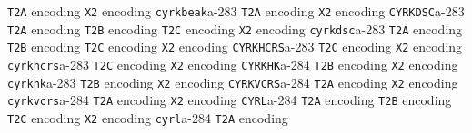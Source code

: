 \documentclass[twoside]{ltxdoc}
\makeatletter
\renewenvironment{theindex}{%
   \@restonecoltrue
   \if@twocolumn\@restonecolfalse\fi
   \columnseprule \z@
   \columnsep 35\p@
   \twocolumn[\index@prologue]%
   \IndexParms
   \let\item\@idxitem
   \ignorespaces
}{\if@restonecol\onecolumn\else\clearpage\fi}
\makeatother
\begin{document}
\begin{theindex}
    \subitem \texttt  {T2A} encoding\pfill {}
    \subitem \texttt  {X2} encoding\pfill {}
  \item \texttt  {cyrkbeak}\pfill a-283
    \subitem \texttt  {T2A} encoding\pfill {}
    \subitem \texttt  {X2} encoding\pfill {}
  \item \texttt  {CYRKDSC}\pfill a-283
    \subitem \texttt  {T2A} encoding\pfill {}
    \subitem \texttt  {T2B} encoding\pfill {}
    \subitem \texttt  {T2C} encoding\pfill {}
    \subitem \texttt  {X2} encoding\pfill {}
  \item \texttt  {cyrkdsc}\pfill a-283
    \subitem \texttt  {T2A} encoding\pfill {}
    \subitem \texttt  {T2B} encoding\pfill {}
    \subitem \texttt  {T2C} encoding\pfill {}
    \subitem \texttt  {X2} encoding\pfill {}
  \item \texttt  {CYRKHCRS}\pfill a-283
    \subitem \texttt  {T2C} encoding\pfill {}
    \subitem \texttt  {X2} encoding\pfill {}
  \item \texttt  {cyrkhcrs}\pfill a-283
    \subitem \texttt  {T2C} encoding\pfill {}
    \subitem \texttt  {X2} encoding\pfill {}
  \item \texttt  {CYRKHK}\pfill a-284
    \subitem \texttt  {T2B} encoding\pfill {}
    \subitem \texttt  {X2} encoding\pfill {}
  \item \texttt  {cyrkhk}\pfill a-283
    \subitem \texttt  {T2B} encoding\pfill {}
    \subitem \texttt  {X2} encoding\pfill {}
  \item \texttt  {CYRKVCRS}\pfill a-284
    \subitem \texttt  {T2A} encoding\pfill {}
    \subitem \texttt  {X2} encoding\pfill {}
  \item \texttt  {cyrkvcrs}\pfill a-284
    \subitem \texttt  {T2A} encoding\pfill {}
    \subitem \texttt  {X2} encoding\pfill {}
  \item \texttt  {CYRL}\pfill a-284
    \subitem \texttt  {T2A} encoding\pfill {}
    \subitem \texttt  {T2B} encoding\pfill {}
    \subitem \texttt  {T2C} encoding\pfill {}
    \subitem \texttt  {X2} encoding\pfill {}
  \item \texttt  {cyrl}\pfill a-284
    \subitem \texttt  {T2A} encoding\pfill {}

\end{theindex}
\end{document}
